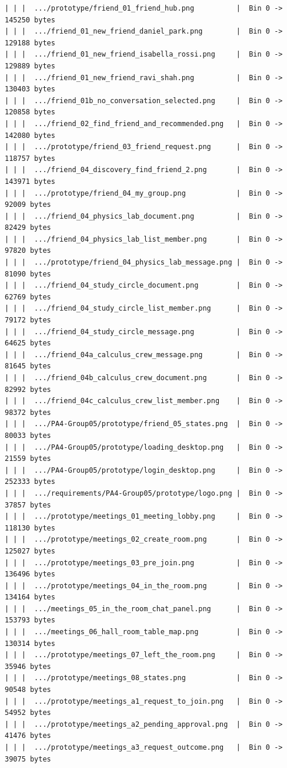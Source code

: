 \documentclass[12pt]{article}
\begin{document}
\begin{lstlisting}[numbers=none,breaklines=true]
| | |  .../prototype/friend_01_friend_hub.png          |  Bin 0 -> 145250 bytes
| | |  .../friend_01_new_friend_daniel_park.png        |  Bin 0 -> 129188 bytes
| | |  .../friend_01_new_friend_isabella_rossi.png     |  Bin 0 -> 129889 bytes
| | |  .../friend_01_new_friend_ravi_shah.png          |  Bin 0 -> 130403 bytes
| | |  .../friend_01b_no_conversation_selected.png     |  Bin 0 -> 120858 bytes
| | |  .../friend_02_find_friend_and_recommended.png   |  Bin 0 -> 142080 bytes
| | |  .../prototype/friend_03_friend_request.png      |  Bin 0 -> 118757 bytes
| | |  .../friend_04_discovery_find_friend_2.png       |  Bin 0 -> 143971 bytes
| | |  .../prototype/friend_04_my_group.png            |  Bin 0 -> 92009 bytes
| | |  .../friend_04_physics_lab_document.png          |  Bin 0 -> 82429 bytes
| | |  .../friend_04_physics_lab_list_member.png       |  Bin 0 -> 97820 bytes
| | |  .../prototype/friend_04_physics_lab_message.png |  Bin 0 -> 81090 bytes
| | |  .../friend_04_study_circle_document.png         |  Bin 0 -> 62769 bytes
| | |  .../friend_04_study_circle_list_member.png      |  Bin 0 -> 79172 bytes
| | |  .../friend_04_study_circle_message.png          |  Bin 0 -> 64625 bytes
| | |  .../friend_04a_calculus_crew_message.png        |  Bin 0 -> 81645 bytes
| | |  .../friend_04b_calculus_crew_document.png       |  Bin 0 -> 82992 bytes
| | |  .../friend_04c_calculus_crew_list_member.png    |  Bin 0 -> 98372 bytes
| | |  .../PA4-Group05/prototype/friend_05_states.png  |  Bin 0 -> 80033 bytes
| | |  .../PA4-Group05/prototype/loading_desktop.png   |  Bin 0 -> 21559 bytes
| | |  .../PA4-Group05/prototype/login_desktop.png     |  Bin 0 -> 252333 bytes
| | |  .../requirements/PA4-Group05/prototype/logo.png |  Bin 0 -> 37857 bytes
| | |  .../prototype/meetings_01_meeting_lobby.png     |  Bin 0 -> 118130 bytes
| | |  .../prototype/meetings_02_create_room.png       |  Bin 0 -> 125027 bytes
| | |  .../prototype/meetings_03_pre_join.png          |  Bin 0 -> 136496 bytes
| | |  .../prototype/meetings_04_in_the_room.png       |  Bin 0 -> 134164 bytes
| | |  .../meetings_05_in_the_room_chat_panel.png      |  Bin 0 -> 153793 bytes
| | |  .../meetings_06_hall_room_table_map.png         |  Bin 0 -> 130314 bytes
| | |  .../prototype/meetings_07_left_the_room.png     |  Bin 0 -> 35946 bytes
| | |  .../prototype/meetings_08_states.png            |  Bin 0 -> 90548 bytes
| | |  .../prototype/meetings_a1_request_to_join.png   |  Bin 0 -> 54952 bytes
| | |  .../prototype/meetings_a2_pending_approval.png  |  Bin 0 -> 41476 bytes
| | |  .../prototype/meetings_a3_request_outcome.png   |  Bin 0 -> 39075 bytes

\end{lstlisting}
\end{document}
